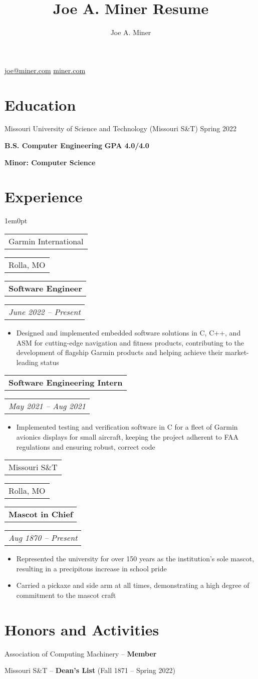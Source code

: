 \documentclass{article}
\makeatletter
\def\indentamount{1em}
\renewcommand{\maketitle}{
    \begin{center}
    {\huge\bfseries\theauthor}

    \vspace{.6em}

    \href{mailto:joe@miner.com}{joe@miner.com} 
    \quad
    \href{https://miner.com}{miner.com}

    \vspace{-.8em}
    \end{center}
}
\newcommand{\getsubsection}[2]{
    \noindent
    \begin{tabular}[t]{@{}l} 
        \large{#1}
    \end{tabular}
    \hfill
    \begin{tabular}[t]{l@{}}
        #2
    \end{tabular}
}
\newcommand{\getsubsubsection}[2]{
    \noindent
    \begin{tabular}[t]{@{}l} 
        \textbf{#1}
    \end{tabular}
    \hfill
    \begin{tabular}[t]{l@{}}
        \emph{#2}
    \end{tabular}
}
\newenvironment{ul}{
    \begin{itemize}[topsep=\parskip, partopsep=\parskip]
    \itemsep-.12em
    \let\olditem\item
    \renewcommand\item{\olditem}
}{
    \vspace{.45em}
    \end{itemize}
}
\makeatother
\begin{document}
\title{Joe A. Miner Resume}
\author{Joe A. Miner}

\maketitle

\section{Education}

Missouri University of Science and Technology (Missouri S\&T) 
\hfill
Spring 2022

\textbf{B.S. Computer Engineering}
\hfill
\textbf{GPA 4.0/4.0}

\textbf{Minor: Computer Science}

\section{Experience}

\begin{adjustwidth}{\indentamount}{0pt}

\getsubsection{Garmin International}{Rolla, MO}

\getsubsubsection{Software Engineer}{June 2022 -- Present}

\begin{ul}
    \item{Designed and implemented embedded software solutions in C, C++, and ASM for cutting-edge navigation and fitness products, contributing to the development of flagship Garmin products and helping achieve their market-leading status}
    \vspace{-1.7em}
\end{ul}

\getsubsubsection{Software Engineering Intern}{May 2021 -- Aug 2021}

\begin{ul}
    \item{Implemented testing and verification software in C for a fleet of Garmin avionics displays for small aircraft, keeping the project adherent to FAA regulations and ensuring robust, correct code}
\end{ul}

\getsubsection{Missouri S\&T}{Rolla, MO}

\getsubsubsection{Mascot in Chief}{Aug 1870 -- Present}

\begin{ul}
    \item{Represented the university for over 150 years as the institution's sole mascot, resulting in a precipitous increase in school pride}
    \item{Carried a pickaxe and side arm at all times, demonstrating a high degree of commitment to the mascot craft}
\end{ul}

\end{adjustwidth}

\vspace{-.4em}

\section{Honors and Activities}

Association of Computing Machinery -- \textbf{Member}

Missouri S\&T -- \textbf{Dean's List} (Fall 1871 -- Spring 2022)
\end{document}
